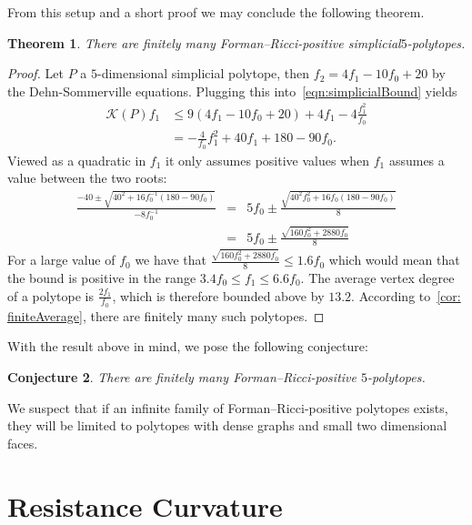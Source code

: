 \documentclass[11pt,a4paper]{amsart}
\newtheorem{theorem}{Theorem}[section]
\newtheorem{conjecture}[theorem]{Conjecture}
\begin{document}
From this setup and a short proof we may conclude the following theorem.

\begin{theorem}
   There are finitely many Forman--Ricci-positive simplicial\break $5$-polytopes. 
\end{theorem}

\begin{proof}
    Let $P$ a $5$-dimensional simplicial polytope, then $f_2= 4f_1-10f_0+20$ by the Dehn-Sommerville equations. Plugging this into~\cref{eqn:simplicialBound} yields
        \begin{align}
            \mathcal{K}(P)f_1 &\le 9(4f_1-10f_0+20) + 4f_1 - 4\frac{f_1^2}{f_0} \\
            &= - \frac{4}{f_0}f_1^2 + 40f_1 +180 -90f_0 .
        \end{align}
    Viewed as a quadratic in $f_1$ it only assumes positive values when $f_1$ assumes a value between the two roots: 
        \begin{eqnarray*}
             \frac{-40 \pm\sqrt{40^2 + 16f_0^{-1}(180-90f_0)}}{-8f_0^{-1}} &=& 5f_0 \pm \frac{\sqrt{40^2f_0^2+16f_0(180-90f_0)}}{8}
             \\ &=& 5f_0 \pm \frac{\sqrt{160f_0^2 +2880f_0}}{8}
        \end{eqnarray*}
    For a large value of $f_0$ we have that $\frac{\sqrt{160f_0^2 +2880f_0}}{8} \le 1.6 f_0$ which would mean that the bound is positive in the range $3.4f_0 \le f_1 \le 6.6f_0$. The average vertex degree of a polytope is $\frac{2f_1}{f_0}$, which is therefore bounded above by $13.2$. According to~\cref{cor: finiteAverage}, there are finitely many such polytopes. 
\end{proof}

With the result above in mind, we pose the following conjecture: 

\begin{conjecture}
    There are finitely many Forman--Ricci-positive $5$-polytopes. 
\end{conjecture}

We suspect that if an infinite family of Forman--Ricci-positive polytopes exists, they will be limited to polytopes with dense graphs and small two dimensional faces.

\section{Resistance Curvature}
\label{sec: resistance results}
\end{document}
